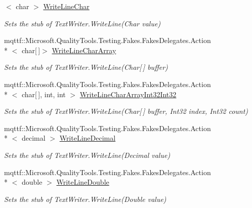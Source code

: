 \begin{DoxyCompactItemize}
$<$ char $>$ \hyperlink{class_system_1_1_i_o_1_1_fakes_1_1_stub_stream_writer_adc925977622115bf20eb6793c75a3f9a}{Write\-Line\-Char}
\begin{DoxyCompactList}\small\item\em Sets the stub of Text\-Writer.\-Write\-Line(\-Char value)\end{DoxyCompactList}\item 
mqttf\-::\-Microsoft.\-Quality\-Tools.\-Testing.\-Fakes.\-Fakes\-Delegates.\-Action\\*
$<$ char\mbox{[}$\,$\mbox{]}$>$ \hyperlink{class_system_1_1_i_o_1_1_fakes_1_1_stub_stream_writer_a790c703e9b051c3c7eb0940e31e1f22b}{Write\-Line\-Char\-Array}
\begin{DoxyCompactList}\small\item\em Sets the stub of Text\-Writer.\-Write\-Line(\-Char\mbox{[}$\,$\mbox{]} buffer)\end{DoxyCompactList}\item 
mqttf\-::\-Microsoft.\-Quality\-Tools.\-Testing.\-Fakes.\-Fakes\-Delegates.\-Action\\*
$<$ char\mbox{[}$\,$\mbox{]}, int, int $>$ \hyperlink{class_system_1_1_i_o_1_1_fakes_1_1_stub_stream_writer_a361c780e56d1e2403dca50659bc1a73c}{Write\-Line\-Char\-Array\-Int32\-Int32}
\begin{DoxyCompactList}\small\item\em Sets the stub of Text\-Writer.\-Write\-Line(\-Char\mbox{[}$\,$\mbox{]} buffer, Int32 index, Int32 count)\end{DoxyCompactList}\item 
mqttf\-::\-Microsoft.\-Quality\-Tools.\-Testing.\-Fakes.\-Fakes\-Delegates.\-Action\\*
$<$ decimal $>$ \hyperlink{class_system_1_1_i_o_1_1_fakes_1_1_stub_stream_writer_a85b9d0752dd714e7106af463315a82a9}{Write\-Line\-Decimal}
\begin{DoxyCompactList}\small\item\em Sets the stub of Text\-Writer.\-Write\-Line(\-Decimal value)\end{DoxyCompactList}\item 
mqttf\-::\-Microsoft.\-Quality\-Tools.\-Testing.\-Fakes.\-Fakes\-Delegates.\-Action\\*
$<$ double $>$ \hyperlink{class_system_1_1_i_o_1_1_fakes_1_1_stub_stream_writer_a74ceb1e259ac7bba566ccb2b0788d6af}{Write\-Line\-Double}
\begin{DoxyCompactList}\small\item\em Sets the stub of Text\-Writer.\-Write\-Line(\-Double value)\end{DoxyCompactList}\item 

\end{DoxyCompactItemize}
